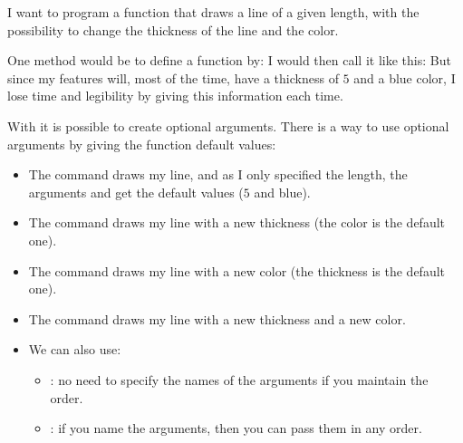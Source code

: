 \documentclass[11pt,class=report,crop=false]{standalone}
\begin{document}
\begin{cours}


I want to program a function that draws a line of a given length, with the possibility to change the thickness of the line and the color.

One method would be to define a function by:
 I would then call it like this:
But since my features will, most of the time, have a thickness of $5$ and a blue color, I lose time and legibility by giving this information each time.

\medskip

With \Python{} it is possible to create optional arguments. There is a way to use optional arguments by giving the function default values:
 
\begin{itemize}
  \item The command  draws my line, and as I only specified the length, the arguments  and  get the default values ($5$ and blue).
  
   \item The command  draws my line with a new thickness (the color is the default one).
   
    \item The command  draws my line with a new color (the thickness is the default one).  
    
     \item The command  draws my line with a new thickness and a new color.
     
     \item We can also use:
     \begin{itemize}
       \item {}: no need to specify the names of the arguments if you maintain the order.
       \item {}: if you name the arguments, then you can pass them in any order.
 
  \end{itemize}   
\end{itemize}   
\end{cours}
\end{document}
